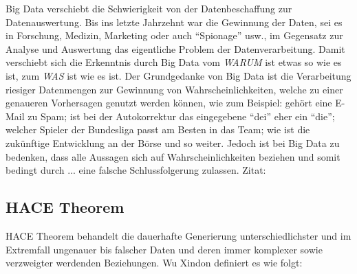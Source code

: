 \documentclass[12pt,journal,compsoc,ngerman]{IEEEtran}
\begin{document}
Big Data verschiebt die Schwierigkeit von der Datenbeschaffung zur Datenauswertung. %
Bis ins letzte Jahrzehnt war die Gewinnung der Daten, sei es in Forschung, Medizin, Marketing oder 
auch \enquote{Spionage} usw., im Gegensatz zur Analyse und Auswertung das eigentliche Problem der Datenverarbeitung.
Damit verschiebt sich die Erkenntnis durch Big Data vom \emph{WARUM} ist etwas so wie es ist, zum \emph{WAS} ist wie es ist.
Der Grundgedanke von Big Data ist die Verarbeitung riesiger Datenmengen zur Gewinnung von Wahrscheinlichkeiten, welche zu einer genaueren Vorhersagen genutzt werden können, wie zum Beispiel:
gehört eine E-Mail zu Spam; ist bei der Autokorrektur das eingegebene \enquote{dei} eher ein \enquote{die}; welcher Spieler der Bundesliga 
passt am Besten in das Team; wie ist die zukünftige Entwicklung an der Börse und so weiter. Jedoch ist bei Big Data zu bedenken, dass alle Aussagen sich auf Wahrscheinlichkeiten beziehen und somit bedingt durch ... eine falsche Schlussfolgerung zulassen.
Zitat: 
\subsection{HACE Theorem}
 HACE Theorem behandelt die dauerhafte Generierung unterschiedlichster und im Extremfall ungenauer bis falscher Daten 
und deren immer komplexer sowie verzweigter werdenden Beziehungen. Wu Xindon definiert es wie folgt: 
\end{document}
